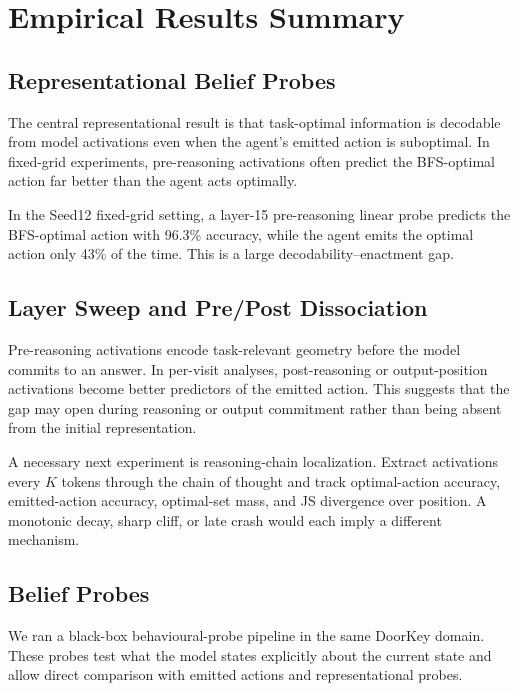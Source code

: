 \documentclass[11pt,a4paper]{article}
\begin{document}
\section{Empirical Results Summary}

\subsection{Representational Belief Probes}

The central representational result is that task-optimal information is decodable from model activations even when the agent's emitted action is suboptimal. In fixed-grid experiments, pre-reasoning activations often predict the BFS-optimal action far better than the agent acts optimally.

\begin{result}
In the Seed12 fixed-grid setting, a layer-15 pre-reasoning linear probe predicts the BFS-optimal action with 96.3\% accuracy, while the agent emits the optimal action only 43\% of the time. This is a large decodability--enactment gap.
\end{result}

\subsection{Layer Sweep and Pre/Post Dissociation}

Pre-reasoning activations encode task-relevant geometry before the model commits to an answer. In per-visit analyses, post-reasoning or output-position activations become better predictors of the emitted action. This suggests that the gap may open during reasoning or output commitment rather than being absent from the initial representation.

\begin{analysisbox}
A necessary next experiment is reasoning-chain localization. Extract activations every $K$ tokens through the chain of thought and track optimal-action accuracy, emitted-action accuracy, optimal-set mass, and JS divergence over position. A monotonic decay, sharp cliff, or late crash would each imply a different mechanism.
\end{analysisbox}

\subsection{Belief Probes}
We ran a black-box behavioural-probe pipeline in the same DoorKey domain. These probes test what the model states explicitly about the current state and allow direct comparison with emitted actions and representational probes.
\end{document}
